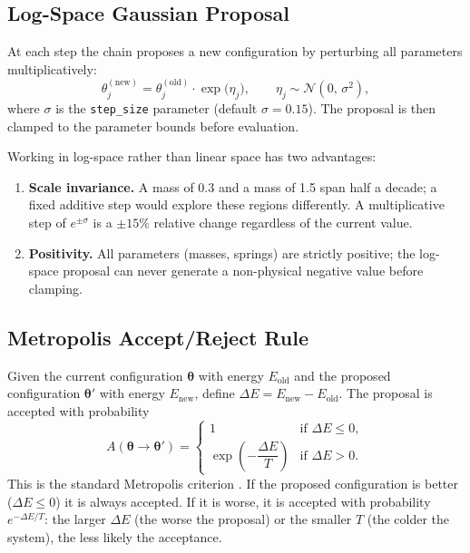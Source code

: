 \documentclass[11pt, letterpaper]{article}
\begin{document}
\subsection{Log-Space Gaussian Proposal}

At each step the chain proposes a new configuration by perturbing all
parameters multiplicatively:
\begin{equation}
  \theta_j^{(\mathrm{new})} = \theta_j^{(\mathrm{old})}
    \cdot \exp\!\bigl(\eta_j\bigr),
    \qquad
    \eta_j \sim \mathcal{N}(0,\,\sigma^2),
\end{equation}
where $\sigma$ is the \texttt{step\_size} parameter (default $\sigma = 0.15$).
The proposal is then clamped to the parameter bounds before evaluation.

Working in log-space rather than linear space has two advantages:
\begin{enumerate}[noitemsep]
  \item \textbf{Scale invariance.}  A mass of 0.3 and a mass of 1.5 span half
        a decade; a fixed additive step would explore these regions
        differently.  A multiplicative step of $e^{\pm\sigma}$ is a
        $\pm 15\%$ relative change regardless of the current value.
  \item \textbf{Positivity.}  All parameters (masses, springs) are strictly
        positive; the log-space proposal can never generate a non-physical
        negative value before clamping.
\end{enumerate}

\subsection{Metropolis Accept/Reject Rule}

Given the current configuration $\boldsymbol{\theta}$ with energy
$E_\mathrm{old}$ and the proposed configuration $\boldsymbol{\theta}'$ with
energy $E_\mathrm{new}$, define $\Delta E = E_\mathrm{new} - E_\mathrm{old}$.
The proposal is accepted with probability
\begin{equation}
  \label{eq:metropolis}
  A(\boldsymbol{\theta} \to \boldsymbol{\theta}')
  =
  \begin{cases}
    1 & \text{if } \Delta E \leq 0, \\[4pt]
    \exp\!\left(-\dfrac{\Delta E}{T}\right) & \text{if } \Delta E > 0.
  \end{cases}
\end{equation}
This is the standard Metropolis criterion \cite{metropolis1953}.  If the
proposed configuration is better ($\Delta E \leq 0$) it is always accepted.
If it is worse, it is accepted with probability $e^{-\Delta E/T}$: the larger
$\Delta E$ (the worse the proposal) or the smaller $T$ (the colder the
system), the less likely the acceptance.
\end{document}
